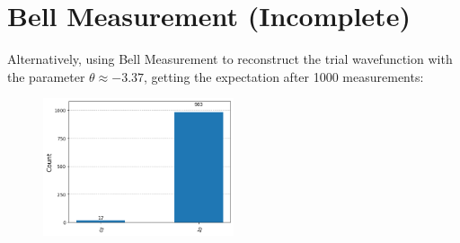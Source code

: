 \documentclass{article}
\begin{document}
\section{Bell Measurement (Incomplete)}
Alternatively, using Bell Measurement to reconstruct the trial wavefunction with the parameter \(\theta \approx -3.37\), getting the expectation after 1000 measurements:
\begin{figure}[H]
	\centering
	\includegraphics[width=0.5\textwidth, height=0.3\textheight]{1000.png}
\end{figure}
\end{document}

